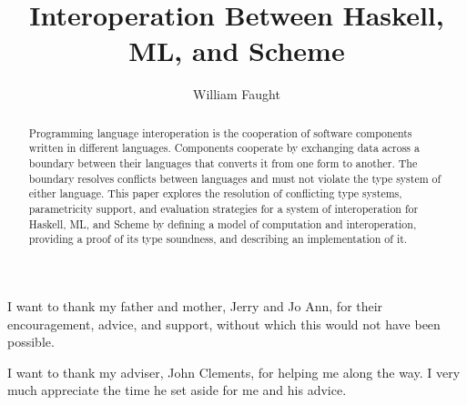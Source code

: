 \documentclass[12pt]{ucthesis}
\begin{document}
\title{Interoperation Between Haskell, ML, and Scheme}
\author{William Faught}
\maketitle

\begin{frontmatter}

\copyrightpage
\approvalpage
\begin{abstract}
Programming language interoperation is the cooperation of software components written in different languages.  Components cooperate by exchanging data across a boundary between their languages that converts it from one form to another.  The boundary resolves conflicts between languages and must not violate the type system of either language.  This paper explores the resolution of conflicting type systems, parametricity support, and evaluation strategies for a system of interoperation for Haskell, ML, and Scheme by defining a model of computation and interoperation, providing a proof of its type soundness, and describing an implementation of it.
\end{abstract}
\begin{acknowledgements}
\indent\indent I want to thank my father and mother, Jerry and Jo Ann, for their encouragement, advice, and support, without which this would not have been possible.

I want to thank my adviser, John Clements, for helping me along the way.  I very much appreciate the time he set aside for me and his advice.
\end{acknowledgements}
\tableofcontents
\listoffigures

\end{frontmatter}

\pagestyle{plain}
\renewcommand{\baselinestretch}{1.66}









\clearpage


\end{document}
